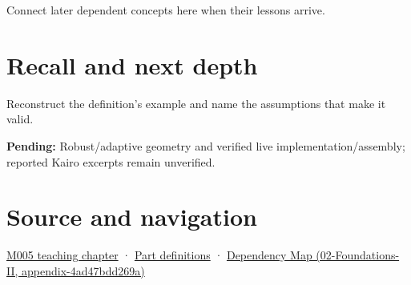 Connect later dependent concepts here when their lessons arrive.

\section{Recall and next depth}\label{appendix-5aef4f13483a-recall-and-next-depth}

Reconstruct the definition's example and name the assumptions that make it valid.

\textbf{Pending:} Robust/adaptive geometry and verified live implementation/assembly; reported Kairo excerpts remain unverified.

\section{Source and navigation}\label{appendix-5aef4f13483a-source-and-navigation}

\href{Continuous\%20Notes/Computing\%20Foundations\%20-\%20From\%20Bits\%20to\%20C++\%20and\%20Systems\%20APIs\#When\%20arithmetic\%20meets\%20uncertainty}{M005 teaching chapter} · \hyperref[appendix-fd090d982a15-m005---parts-77-88]{Part definitions} · \href{../02-Foundations-II/main.pdf\#nameddest=appendix-4ad47bdd269a}{Dependency Map (02-Foundations-II, appendix-4ad47bdd269a)}
